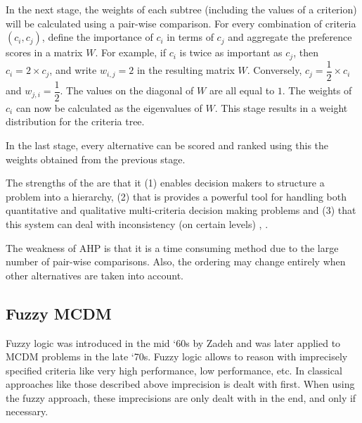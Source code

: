 \begin{figure}
    \begin{center}
        \caption{}
        \label{fig:ahp-stage1}
    \end{center}
\end{figure}

In the next stage, the weights of each subtree (including the values of a criterion) will be calculated using a pair-wise comparison. For every combination of criteria $(c_i, c_j)$, define the importance of $c_i$ in terms of $c_j$ and aggregate the preference scores in a matrix $W$. For example, if $c_i$ is twice as important as $c_j$, then $c_i = 2 \times c_j$, and write $w_{i,j} = 2$ in the resulting matrix $W$. Conversely, $c_j = \dfrac{1}{2} \times c_i$ and $w_{j,i} = \dfrac{1}{2}$. The values on the diagonal of $W$ are all equal to $1$. The weights of $c_i$ can now be calculated as the eigenvalues of $W$. This stage results in a weight distribution for the criteria tree. 

In the last stage, every alternative can be scored and ranked using this the weights obtained from the previous stage. 

The strengths of the are that it (1) enables decision makers to structure a problem into a hierarchy, (2) that is provides a powerful tool for handling both quantitative and qualitative multi-criteria decision making problems and (3) that this system can deal with inconsistency (on certain levels) \cite{Jadhav:2009}, \cite{}. 


The weakness of AHP is that it is a time consuming method due to the large number of pair-wise comparisons. Also, the ordering may change entirely when other alternatives are taken into account.

\subsection{Fuzzy MCDM}
\label{sec:fuzzy}


Fuzzy logic was introduced in the mid `60s by Zadeh and was later applied to MCDM problems in the late `70s. Fuzzy logic allows to reason with imprecisely specified criteria like very high performance, low performance, etc. In classical approaches like those described above imprecision is dealt with first. When using the fuzzy approach, these imprecisions are only dealt with in the end, and only if necessary.

